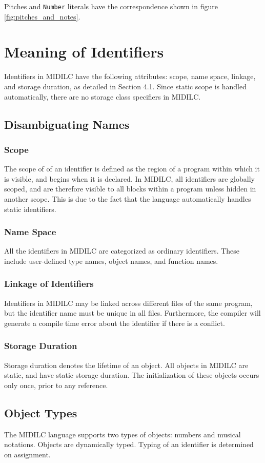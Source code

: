 \documentclass[12pt,A4]{book}
\begin{document}
Pitches and \verb|Number| literals have the correspondence shown in figure \ref{fig:pitches_and_notes}.

\section{Meaning of Identifiers}
Identifiers in MIDILC have the following attributes: scope, name space, linkage, and storage duration, as detailed in Section 4.1. Since static scope is handled automatically, there are no storage class specifiers in MIDILC.
\subsection{Disambiguating Names}
\subsubsection{Scope}
The scope of of an identifier is defined as the region of a program within which it is visible, and begins when it is declared. In MIDILC, all identifiers are globally scoped, and are therefore visible to all blocks within a program unless hidden in another scope. This is due to the fact that the language automatically handles static identifiers.
\subsubsection{Name Space}
All the identifiers in MIDILC are categorized as ordinary identifiers. These include user-defined type names, object names, and function names.
\subsubsection{Linkage of Identifiers}
Identifiers in MIDILC may be linked across different files of the same program, but the identifier name must be unique in all files. Furthermore, the compiler will generate a compile time error about the identifier if there is a conflict.
\subsubsection{Storage Duration}
Storage duration denotes the lifetime of an object. All objects in MIDILC are static, and have static storage duration. The initialization of these objects occurs only once, prior to any reference.
\subsection{Object Types}
The MIDILC language supports two types of objects: numbers and musical notations.  Objects are dynamically typed.  Typing of an identifier is determined on assignment.
\end{document}
